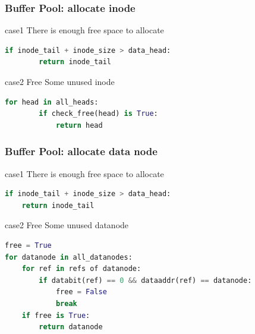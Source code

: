 \documentclass[notheorems, aspectratio=54]{beamer}
\begin{document}
\begin{frame}[fragile]
    \frametitle{Buffer Pool: allocate inode}
    
        \begin{block} {case1}
            There is enough free space to allocate
        \end{block}
        \begin{lstlisting}[language=python]
    if inode_tail + inode_size > data_head:
        return inode_tail
        \end{lstlisting}

        \begin{block} {case2}
            Free Some unused inode
        \end{block}
        \begin{lstlisting}[language=python]
    for head in all_heads:
        if check_free(head) is True:
            return head
        \end{lstlisting}
        
\end{frame}

\begin{frame}[fragile]
    \frametitle{Buffer Pool: allocate data node}
    \begin{block} {case1}
        There is enough free space to allocate
    \end{block}
    \begin{lstlisting}[language=python]
if inode_tail + inode_size > data_head:
    return inode_tail
    \end{lstlisting}

    \begin{block} {case2}
        Free Some unused datanode
    \end{block}
    \begin{lstlisting}[language=python]
free = True
for datanode in all_datanodes:
    for ref in refs of datanode:
        if databit(ref) == 0 && dataaddr(ref) == datanode:
            free = False
            break
    if free is True:
        return datanode
    \end{lstlisting}
\end{frame}
\end{document}
